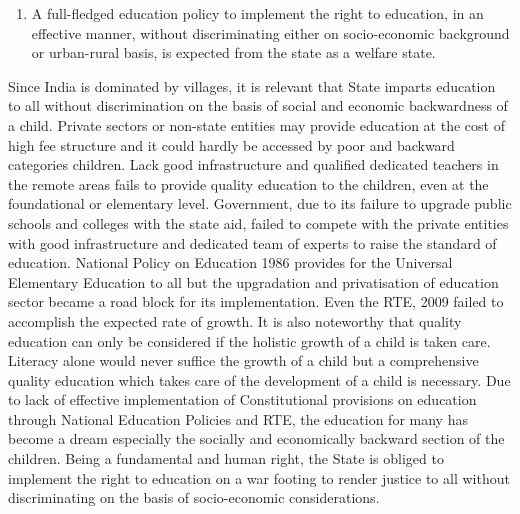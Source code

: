 \begin{multicols}{2}
\begin{enumerate}[label=$-$]
\item A full-fledged education policy to implement the right to education, in an
effective manner, without discriminating either on socio-economic background or
urban-rural basis, is expected from the state as a welfare state.
\end{enumerate}


\noi
Since India is dominated by villages, it is relevant that State imparts education to all without
discrimination on the basis of social and economic backwardness of a child. Private sectors or
non-state entities may provide education at the cost of high fee structure and it could hardly
be accessed by poor and backward categories children. Lack good infrastructure and qualified
dedicated teachers in the remote areas fails to provide quality education to the children, even
at the foundational or elementary level. Government, due to its failure to upgrade public
schools and colleges with the state aid, failed to compete with the private entities with good
infrastructure and dedicated team of experts to raise the standard of education. National
Policy on Education 1986 provides for the Universal Elementary Education to all but the upgradation and privatisation of education sector became a road block for its implementation.
Even the RTE, 2009 failed to accomplish the expected rate of growth. It is also noteworthy
that quality education can only be considered if the holistic growth of a child is taken care.
Literacy alone would never suffice the growth of a child but a comprehensive quality
education which takes care of the development of a child is necessary. Due to lack of
effective implementation of Constitutional provisions on education through National Education Policies and RTE, the education for many has become a dream especially the
socially and economically backward section of the children. Being a fundamental and human
right, the State is obliged to implement the right to education on a war footing to render
justice to all without discriminating on the basis of socio-economic considerations.

\end{multicols}
